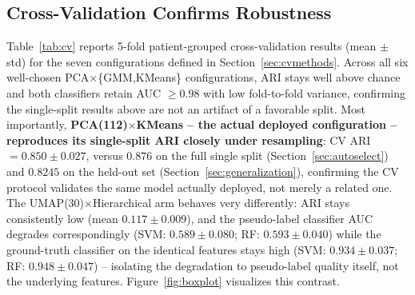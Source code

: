 \documentclass[sigconf]{acmart}
\begin{document}
\subsection{Cross-Validation Confirms Robustness}
Table~\ref{tab:cv} reports 5-fold patient-grouped cross-validation results (mean $\pm$ std) for the seven configurations defined in Section~\ref{sec:cvmethods}. Across all six well-chosen PCA$\times$\{GMM,KMeans\} configurations, ARI stays well above chance and both classifiers retain AUC $\geq 0.98$ with low fold-to-fold variance, confirming the single-split results above are not an artifact of a favorable split. Most importantly, \textbf{PCA(112)$\times$KMeans -- the actual deployed configuration -- reproduces its single-split ARI closely under resampling}: CV ARI $=0.850\pm0.027$, versus $0.876$ on the full single split (Section~\ref{sec:autoselect}) and $0.8245$ on the held-out set (Section~\ref{sec:generalization}), confirming the CV protocol validates the same model actually deployed, not merely a related one. The UMAP(30)$\times$Hierarchical arm behaves very differently: ARI stays consistently low (mean $0.117 \pm 0.009$), and the pseudo-label classifier AUC degrades correspondingly (SVM: $0.589 \pm 0.080$; RF: $0.593 \pm 0.040$) while the ground-truth classifier on the identical features stays high (SVM: $0.934\pm0.037$; RF: $0.948\pm0.047$) -- isolating the degradation to pseudo-label quality itself, not the underlying features. Figure~\ref{fig:boxplot} visualizes this contrast.

\begin{table}[t]
\caption{5-fold patient-grouped CV: ARI and AUC (mean $\pm$ std). The last row's classifier is trained on the same UMAP(30) features used to generate its (deliberately poor) pseudo-label (Section~\ref{sec:cvmethods}).}
\label{tab:cv}
\end{table}
\end{document}
